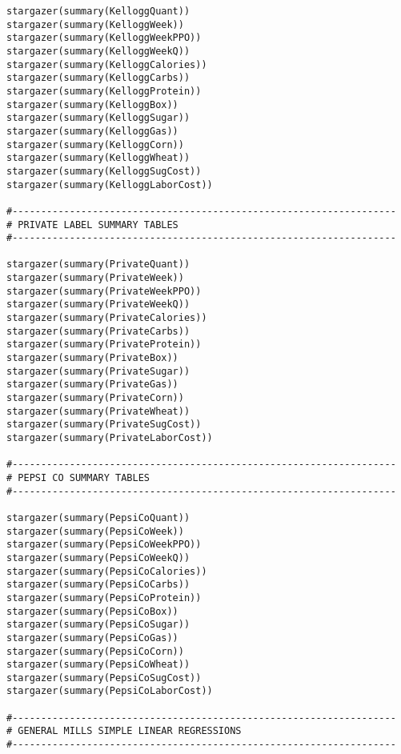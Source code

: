 \documentclass[12pt,english]{article}
\begin{document}
\begin{lstlisting}
stargazer(summary(KelloggQuant))
stargazer(summary(KelloggWeek))
stargazer(summary(KelloggWeekPPO))
stargazer(summary(KelloggWeekQ))
stargazer(summary(KelloggCalories))
stargazer(summary(KelloggCarbs))
stargazer(summary(KelloggProtein))
stargazer(summary(KelloggBox))
stargazer(summary(KelloggSugar))
stargazer(summary(KelloggGas))
stargazer(summary(KelloggCorn))
stargazer(summary(KelloggWheat))
stargazer(summary(KelloggSugCost))
stargazer(summary(KelloggLaborCost))

#-------------------------------------------------------------------
# PRIVATE LABEL SUMMARY TABLES
#-------------------------------------------------------------------

stargazer(summary(PrivateQuant))
stargazer(summary(PrivateWeek))
stargazer(summary(PrivateWeekPPO))
stargazer(summary(PrivateWeekQ))
stargazer(summary(PrivateCalories))
stargazer(summary(PrivateCarbs))
stargazer(summary(PrivateProtein))
stargazer(summary(PrivateBox))
stargazer(summary(PrivateSugar))
stargazer(summary(PrivateGas))
stargazer(summary(PrivateCorn))
stargazer(summary(PrivateWheat))
stargazer(summary(PrivateSugCost))
stargazer(summary(PrivateLaborCost))

#-------------------------------------------------------------------
# PEPSI CO SUMMARY TABLES
#-------------------------------------------------------------------

stargazer(summary(PepsiCoQuant))
stargazer(summary(PepsiCoWeek))
stargazer(summary(PepsiCoWeekPPO))
stargazer(summary(PepsiCoWeekQ))
stargazer(summary(PepsiCoCalories))
stargazer(summary(PepsiCoCarbs))
stargazer(summary(PepsiCoProtein))
stargazer(summary(PepsiCoBox))
stargazer(summary(PepsiCoSugar))
stargazer(summary(PepsiCoGas))
stargazer(summary(PepsiCoCorn))
stargazer(summary(PepsiCoWheat))
stargazer(summary(PepsiCoSugCost))
stargazer(summary(PepsiCoLaborCost))

#-------------------------------------------------------------------
# GENERAL MILLS SIMPLE LINEAR REGRESSIONS
#-------------------------------------------------------------------


\end{lstlisting}
\end{document}
